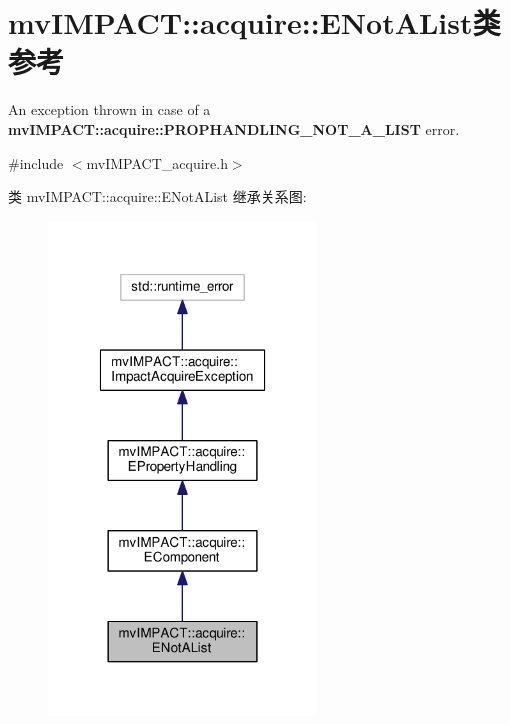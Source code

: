 \hypertarget{classmv_i_m_p_a_c_t_1_1acquire_1_1_e_not_a_list}{\section{mv\+I\+M\+P\+A\+C\+T\+:\+:acquire\+:\+:E\+Not\+A\+List类 参考}
\label{classmv_i_m_p_a_c_t_1_1acquire_1_1_e_not_a_list}
}


An exception thrown in case of a {\bfseries mv\+I\+M\+P\+A\+C\+T\+::acquire\+::\+P\+R\+O\+P\+H\+A\+N\+D\+L\+I\+N\+G\+\_\+\+N\+O\+T\+\_\+\+A\+\_\+\+L\+I\+S\+T} error.  




{\ttfamily \#include $<$mv\+I\+M\+P\+A\+C\+T\+\_\+acquire.\+h$>$}



类 mv\+I\+M\+P\+A\+C\+T\+:\+:acquire\+:\+:E\+Not\+A\+List 继承关系图\+:
\nopagebreak
\begin{figure}[H]
\begin{center}
\leavevmode
\includegraphics[width=202pt]{classmv_i_m_p_a_c_t_1_1acquire_1_1_e_not_a_list__inherit__graph}
\end{center}
\end{figure}


